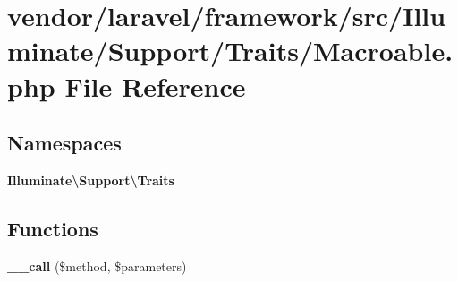 \section{vendor/laravel/framework/src/\+Illuminate/\+Support/\+Traits/\+Macroable.php File Reference}
\label{_macroable_8php}
\subsection*{Namespaces}
\begin{DoxyCompactItemize}
\item 
 {\bf Illuminate\textbackslash{}\+Support\textbackslash{}\+Traits}
\end{DoxyCompactItemize}
\subsection*{Functions}
\begin{DoxyCompactItemize}
\item 
{\bf \+\_\+\+\_\+call} (\$method, \$parameters)
\end{DoxyCompactItemize}
